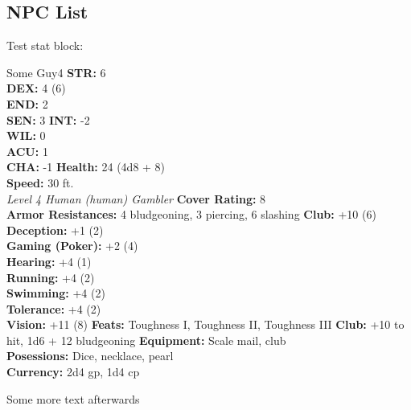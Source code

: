 \subsection{NPC List}

Test stat block:
\begin{statblock}{Some Guy}{4}
    \statblockstats
    {
        \textbf{STR:} 6 \\
        \textbf{DEX:} 4 (6) \\
        \textbf{END:} 2 \\
        \textbf{SEN:} 3
    }
    {
        \textbf{INT:} -2 \\
        \textbf{WIL:} 0 \\
        \textbf{ACU:} 1 \\
        \textbf{CHA:} -1
    }
    {
        \textbf{Health:} 24 (4d8 + 8) \\
        \textbf{Speed:} 30 ft. \\
        \textit{Level 4 Human (human) Gambler}
    }
    \statblockdef
    {
        \textbf{Cover Rating:} 8 \\
        \textbf{Armor Resistances:} 4 bludgeoning, 3 piercing, 6 slashing
    }
    \statblockskillsfeats
    {
        \textbf{Club:} +10 (6) \\
        \textbf{Deception:} +1 (2) \\
        \textbf{Gaming (Poker):} +2 (4) \\
        \textbf{Hearing:} +4 (1) \\
        \textbf{Running:} +4 (2) \\
        \textbf{Swimming:} +4 (2) \\
        \textbf{Tolerance:} +4 (2) \\
        \textbf{Vision:} +11 (8)
    }
    {
        \textbf{Feats:} Toughness I, Toughness II, Toughness III
    }
    \statblockact
    {
        \textbf{Club:} +10 to hit, 1d6 + 12 bludgeoning
    }
    \statblockinv
    {
        \textbf{Equipment:} Scale mail, club \\
        \textbf{Posessions:} Dice, necklace, pearl \\
    \textbf{Currency:} 2d4 gp, 1d4 cp
    }
\end{statblock}

Some more text afterwards
